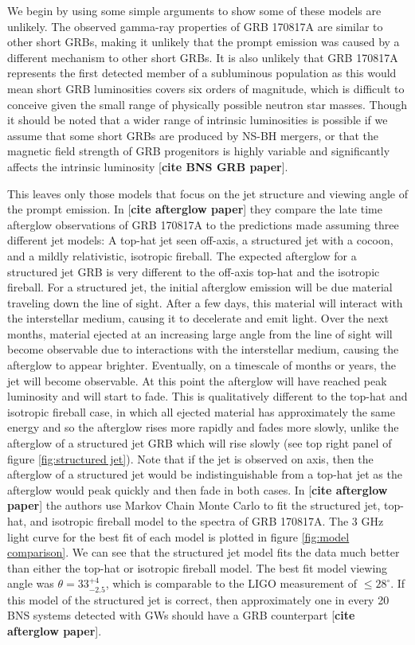 \documentclass[11pt]{cuthesis}
\begin{document}
We begin by using some simple arguments to show some of these models are unlikely. The observed gamma-ray properties of GRB 170817A are similar to other short GRBs, making it unlikely that the prompt emission was caused by a different mechanism to other short GRBs. It is also unlikely that GRB 170817A represents the first detected member of a subluminous population as this would mean short GRB luminosities covers six orders of magnitude, which is difficult to conceive given the small range of physically possible neutron star masses. Though it should be noted that a wider range of intrinsic luminosities is possible if we assume that some short GRBs are produced by NS-BH mergers, or that the magnetic field strength of GRB progenitors is highly variable and significantly affects the intrinsic luminosity [\textbf{cite BNS GRB paper}].

This leaves only those models that focus on the jet structure and viewing angle of the prompt emission. In [\textbf{cite afterglow paper}] they compare the late time afterglow observations of GRB 170817A to the predictions made assuming three different jet models: A top-hat jet seen off-axis, a structured jet with a cocoon, and a mildly relativistic, isotropic fireball. The expected afterglow for a structured jet GRB is very different to the off-axis top-hat and the isotropic fireball. For a structured jet, the initial afterglow emission will be due material traveling down the line of sight. After a few days, this material will interact with the interstellar medium, causing it to decelerate and emit light. Over the next months, material ejected at an increasing large angle from the line of sight will become observable due to interactions with the interstellar medium, causing the afterglow to appear brighter. Eventually, on a timescale of months or years, the jet will become observable. At this point the afterglow will have reached peak luminosity and will start to fade. This is qualitatively different to the top-hat and isotropic fireball case, in which all ejected material has approximately the same energy and so the afterglow rises more rapidly and fades more slowly, unlike the afterglow of a structured jet GRB which will rise slowly (see top right panel of figure \ref{fig:structured jet}). Note that if the jet is observed on axis, then the afterglow of a structured jet would be indistinguishable from a top-hat jet as the afterglow would peak quickly and then fade in both cases. In [\textbf{cite afterglow paper}] the authors use Markov Chain Monte Carlo to fit the structured jet, top-hat, and isotropic fireball model to the spectra of GRB 170817A. The 3 GHz light curve for the best fit of each model is plotted in figure \ref{fig:model comparison}. We can see that the structured jet model fits the data much better than either the top-hat or isotropic fireball model. The best fit model viewing angle was $\theta = 33^{+4}_{-2.5}$, which is comparable to the LIGO measurement of $\leq 28^\circ$. If this model of the structured jet is correct, then approximately one in every 20 BNS systems detected with GWs should have a GRB counterpart [\textbf{cite afterglow paper}]. 
\end{document}
